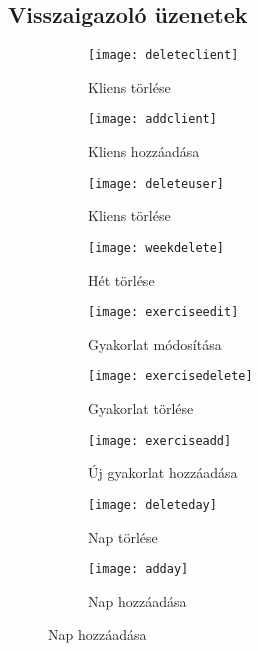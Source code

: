 \subsection{Visszaigazoló üzenetek}

\begin{figure}[htbp]
	\centering
	\begin{subfigure}[b]{0.3\textwidth}
			\centering
			\texttt{[image: deleteclient]}
			\caption{Kliens törlése}
			\label{fig:deleteclient}
	\end{subfigure}
	\hfill
	\begin{subfigure}[b]{0.3\textwidth}
			\centering
			\texttt{[image: addclient]}
			\caption{Kliens hozzáadása}
			\label{fig:addclient}
	\end{subfigure}
	\hfill
	\begin{subfigure}[b]{0.3\textwidth}
			\centering
			\texttt{[image: deleteuser]}
			\caption{Kliens törlése}
			\label{fig:deleteuser}
	\end{subfigure}
	
	\medskip
	
	\begin{subfigure}[b]{0.3\textwidth}
			\centering
			\texttt{[image: weekdelete]}
			\caption{Hét törlése}
			\label{fig:weekdelete}
	\end{subfigure}
	\hfill
	\begin{subfigure}[b]{0.3\textwidth}
			\centering
			\texttt{[image: exerciseedit]}
			\caption{Gyakorlat módosítása}
			\label{fig:exerciseedit}
	\end{subfigure}
	\hfill
	\begin{subfigure}[b]{0.3\textwidth}
			\centering
			\texttt{[image: exercisedelete]}
			\caption{Gyakorlat törlése}
			\label{fig:exercisedelete}
	\end{subfigure}
	
	\medskip
	
	\begin{subfigure}[b]{0.3\textwidth}
			\centering
			\texttt{[image: exerciseadd]}
			\caption{Új gyakorlat hozzáadása}
			\label{fig:exerciseadd}
	\end{subfigure}
	\hfill
	\begin{subfigure}[b]{0.3\textwidth}
			\centering
			\texttt{[image: deleteday]}
			\caption{Nap törlése}
			\label{fig:deleteday}
	\end{subfigure}
	\hfill
	\begin{subfigure}[b]{0.3\textwidth}
			\centering
			\texttt{[image: adday]}
			\caption{Nap hozzáadása}
			\label{fig:adday}
	\end{subfigure}
	

\end{figure}
